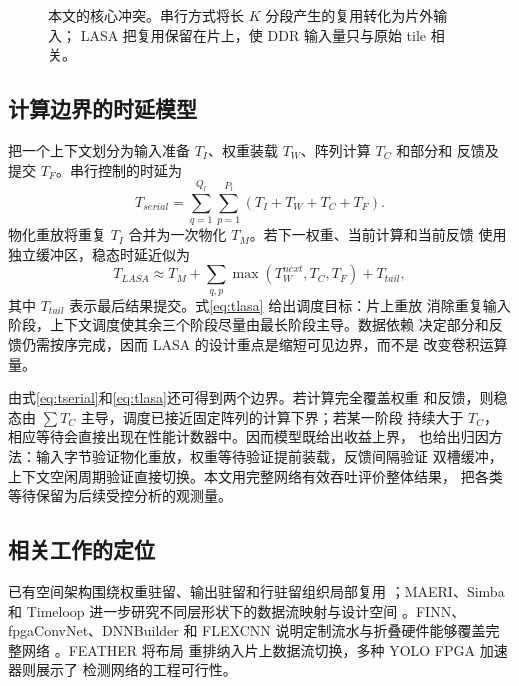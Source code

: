\begin{figure}[t]
\centering
{}
\caption{本文的核心冲突。串行方式将长 $K$ 分段产生的复用转化为片外输入；
LASA 把复用保留在片上，使 DDR 输入量只与原始 tile 相关。}
\label{fig:conflict-placeholder}
\end{figure}

\subsection{计算边界的时延模型}

把一个上下文划分为输入准备 $T_I$、权重装载 $T_W$、阵列计算 $T_C$ 和部分和
反馈及提交 $T_F$。串行控制的时延为
\begin{equation}
T_{serial}=\sum_{q=1}^{Q_l}\sum_{p=1}^{P_l}
(T_I+T_W+T_C+T_F).
\label{eq:tserial}
\end{equation}
物化重放将重复 $T_I$ 合并为一次物化 $T_M$。若下一权重、当前计算和当前反馈
使用独立缓冲区，稳态时延近似为
\begin{equation}
T_{LASA}\approx T_M+
\sum_{q,p}\max(T_W^{next},T_C,T_F)+T_{tail},
\label{eq:tlasa}
\end{equation}
其中 $T_{tail}$ 表示最后结果提交。式\eqref{eq:tlasa} 给出调度目标：片上重放
消除重复输入阶段，上下文调度使其余三个阶段尽量由最长阶段主导。数据依赖
决定部分和反馈仍需按序完成，因而 LASA 的设计重点是缩短可见边界，而不是
改变卷积运算量。

由式\eqref{eq:tserial}和\eqref{eq:tlasa}还可得到两个边界。若计算完全覆盖权重
和反馈，则稳态由 $\sum T_C$ 主导，调度已接近固定阵列的计算下界；若某一阶段
持续大于 $T_C$，相应等待会直接出现在性能计数器中。因而模型既给出收益上界，
也给出归因方法：输入字节验证物化重放，权重等待验证提前装载，反馈间隔验证
双槽缓冲，上下文空闲周期验证直接切换。本文用完整网络有效吞吐评价整体结果，
把各类等待保留为后续受控分析的观测量。

\subsection{相关工作的定位}

已有空间架构围绕权重驻留、输出驻留和行驻留组织局部复用
\cite{chen2016eyeriss,eyerissv2,sze2017efficient}；MAERI、Simba 和 Timeloop
进一步研究不同层形状下的数据流映射与设计空间
\cite{maeri2018,simba2019,timeloop2019}。FINN、fpgaConvNet、DNNBuilder 和
FLEXCNN 说明定制流水与折叠硬件能够覆盖完整网络
\cite{finn2017,fpgaConvNet2015,dnnBuilder2018,flexcnn2020}。FEATHER 将布局
重排纳入片上数据流切换\cite{feather2024}，多种 YOLO FPGA 加速器则展示了
检测网络的工程可行性\cite{yolov2fpga2018,yolov3fpga2019,tinyyoloaccel2022,
multicoreyolo2023}。


